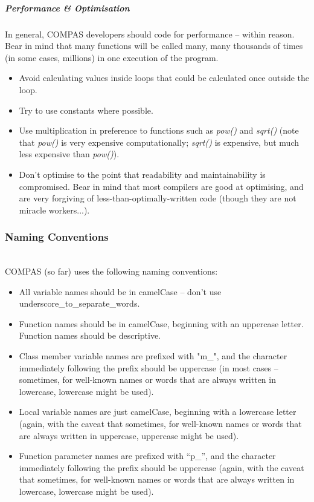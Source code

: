 \subparagraph{Performance \& Optimisation}\label{sec:PerformanceOptimisation}\mbox{}

\medskip
In general, COMPAS developers should code for performance -- within reason. Bear in mind that many functions will be called many, many thousands of times (in some cases, millions) in one execution of the program.  

\begin{itemize}
    \item{Avoid calculating values inside loops that could be calculated once outside the loop.}

    \item{Try to use constants where possible.}

    \item{Use multiplication in preference to functions such as \textit{pow()} and \textit{sqrt()} (note that \textit{pow()} is very expensive computationally; \textit{sqrt()} is expensive, but much less expensive than \textit{pow()}).}

    \item{Don't optimise to the point that readability and maintainability is compromised. Bear in mind that most compilers are good at optimising, and are very forgiving of less-than-optimally-written code (though they are not miracle workers...).}
\end{itemize}

\subsubsection{Naming Conventions}\label{sec:NamingConventions}\mbox{} \\

COMPAS (so far) uses the following naming conventions:
 
\begin{itemize}
    \item{All variable names should be in camelCase -- don't use underscore\_to\_separate\_words.}

    \item{Function names should be in camelCase, beginning with an uppercase letter.  Function names should be descriptive.}

    \item{Class member variable names are prefixed with "m\_", and the character immediately following the prefix should be uppercase (in most cases -- sometimes, for well-known names or words that are always written in lowercase, lowercase might be used).}

    \item{Local variable names are just camelCase, beginning with a lowercase letter (again, with the caveat that sometimes, for well-known names or words that are always written in uppercase, uppercase might be used).}

    \item{Function parameter names are prefixed with ``p\_'', and the character immediately following the prefix should be uppercase (again, with the caveat that sometimes, for well-known names or words that are always written in lowercase, lowercase might be used).}
\end{itemize}
